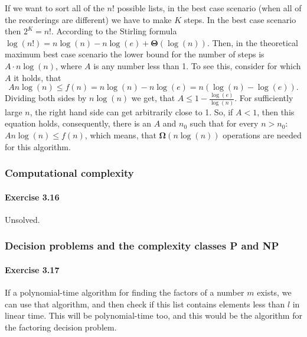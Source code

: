 \documentclass[a4paper,12pt]{article}
\newcommand{\exercise}[1]{\paragraph{Exercise #1}}
\begin{document}
    If we want to sort all of the $n!$ possible lists, in the best case scenario (when all of the reorderings are different) we have to make $K$ steps. In the best case scenario then $2^K = n!$. According to the Stirling formula $\log(n!) = n \log(n) - n \log(e) + \boldsymbol{\Theta}(\log(n))$. Then, in the theoretical maximum best case scenario the lower bound for the number of steps is $A \cdot n\log(n)$, where $A$ is any number less than 1. To see this, consider for which $A$ it holds, that
    \begin{equation}
        A n \log(n) \leq f(n) = n \log(n) - n \log(e) = n ( \log(n) - \log(e) ) \textrm{.}
    \end{equation}
    Dividing both sides by $n \log(n)$ we get, that $A \leq 1 - \frac{\log(e)}{\log(n)}$. For sufficiently large $n$, the right hand side can get arbitrarily close to 1. So, if $A < 1$, then this equation holds, consequently, there is an $A$ and $n_0$ such that for every $n > n_0$: $A n \log(n) \leq f(n)$, which means, that $\boldsymbol{\Omega}(n \log(n))$ operations are needed for this algorithm.


    \subsubsection{Computational complexity}

    \exercise{3.16} Unsolved.

    \subsubsection{Decision problems and the complexity classes P and NP}

    \exercise{3.17} If a polynomial-time algorithm for finding the factors of a number $m$ exists, we can use that algorithm, and then check if this list contains elements less than $l$ in linear time. This will be polynomial-time too, and this would be the algorithm for the factoring decision problem.
\end{document}
